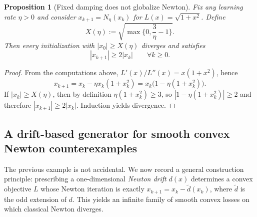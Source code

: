 \documentclass{article}
\theoremstyle{plain}
\newtheorem{proposition}[theorem]{Proposition}
\theoremstyle{definition}
\theoremstyle{remark}
\begin{document}
\begin{proposition}[Fixed damping does not globalize Newton]
\label{prop:damped_not_global}
Fix any learning rate $\eta>0$ and consider $x_{k+1}=N_\eta(x_k)$ for
$L(x)=\sqrt{1+x^2}$. Define
\[
  X(\eta) := \sqrt{\max\Big\{0,\frac{3}{\eta}-1\Big\}}.
\]
Then every initialization with $|x_0|\ge X(\eta)$ diverges and satisfies
\[
  |x_{k+1}|\ge 2|x_k| \qquad \forall k\ge 0.
\]
\end{proposition}

\begin{proof}
From the computations above, $L'(x)/L''(x)=x(1+x^2)$, hence
\[
x_{k+1}=x_k-\eta x_k(1+x_k^2)=x_k\big(1-\eta(1+x_k^2)\big).
\]
If $|x_k|\ge X(\eta)$, then by definition $\eta(1+x_k^2)\ge 3$, so
$|1-\eta(1+x_k^2)|\ge 2$ and therefore $|x_{k+1}|\ge 2|x_k|$.
Induction yields divergence.
\end{proof}

\subsection{A drift-based generator for smooth convex Newton counterexamples}
\label{app:drift_generator}

The previous example is not accidental. We now record a general construction
principle: prescribing a one-dimensional \emph{Newton drift} $d(x)$ determines a
convex objective $L$ whose Newton iteration is exactly $x_{k+1}=x_k-\tilde d(x_k)$,
where $\tilde d$ is the odd extension of $d$. This yields an infinite family of
smooth convex losses on which classical Newton diverges.
\end{document}
